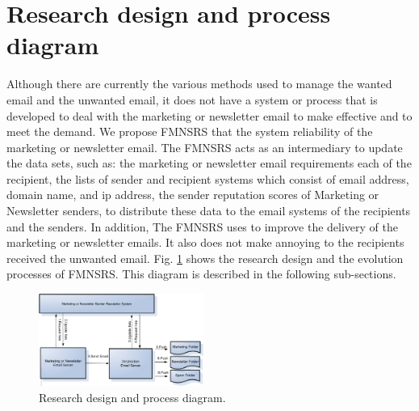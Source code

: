 \documentclass[conference]{IEEEtran}
\begin{document}
\section{Research design and process diagram}
Although there are currently the various methods used to manage the wanted email and the unwanted email, it does not have a system or process that is developed to deal with the marketing or newsletter email to make effective and to meet the demand.
%
We propose FMNSRS that the system reliability of the marketing or newsletter email.
The FMNSRS acts as an intermediary to update the data sets, such as: 
the marketing or newsletter email requirements each of the recipient, 
the lists of sender and recipient systems which consist of email address, domain name, and ip address, 
the sender reputation scores of Marketing or Newsletter senders, 
to distribute these data to the email systems of the recipients and the senders.
In addition, The FMNSRS uses to improve the delivery of the marketing or newsletter emails. 
It also does not make annoying to the recipients received the unwanted email.
Fig. \ref{fig:FMNRS} shows the research design and the evolution processes of FMNSRS. 
This diagram is described in the following sub-sections.

\begin{figure}
\centering
\includegraphics[width=0.48\textwidth]{1_FMNSRS.pdf}
\caption{Research design and process diagram.}
\label{fig:FMNRS}
\end{figure}

\end{document}
